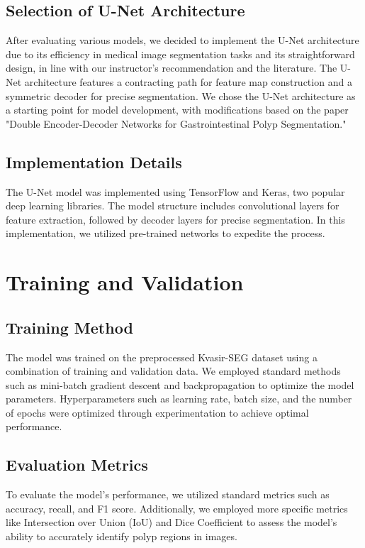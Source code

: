 \documentclass[12pt]{article}
\begin{document}
\subsection{Selection of U-Net Architecture}
After evaluating various models, we decided to implement the U-Net architecture due to its efficiency in medical image segmentation tasks and its straightforward design, in line with our instructor's recommendation and the literature. The U-Net architecture features a contracting path for feature map construction and a symmetric decoder for precise segmentation. We chose the U-Net architecture as a starting point for model development, with modifications based on the paper "Double Encoder-Decoder Networks for Gastrointestinal Polyp Segmentation."

\subsection{Implementation Details}
The U-Net model was implemented using TensorFlow and Keras, two popular deep learning libraries. The model structure includes convolutional layers for feature extraction, followed by decoder layers for precise segmentation. In this implementation, we utilized pre-trained networks to expedite the process.

\section{Training and Validation}
\subsection{Training Method}
The model was trained on the preprocessed Kvasir-SEG dataset using a combination of training and validation data. We employed standard methods such as mini-batch gradient descent and backpropagation to optimize the model parameters. Hyperparameters such as learning rate, batch size, and the number of epochs were optimized through experimentation to achieve optimal performance.

\subsection{Evaluation Metrics}
To evaluate the model's performance, we utilized standard metrics such as accuracy, recall, and F1 score. Additionally, we employed more specific metrics like Intersection over Union (IoU) and Dice Coefficient to assess the model's ability to accurately identify polyp regions in images.
\end{document}
